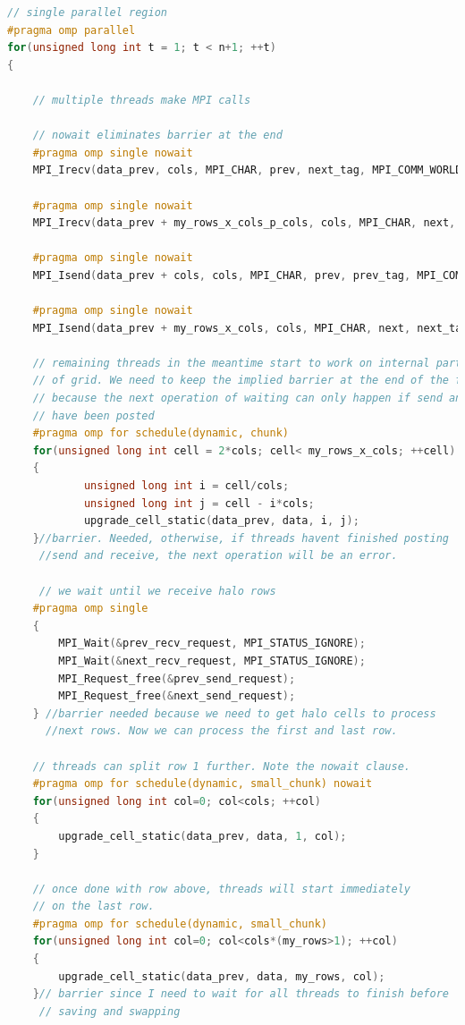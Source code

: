 \documentclass{report}
\begin{document}
\begin{lstlisting}[language=C++]
// single parallel region
#pragma omp parallel
for(unsigned long int t = 1; t < n+1; ++t)
{

    // multiple threads make MPI calls

    // nowait eliminates barrier at the end
    #pragma omp single nowait
    MPI_Irecv(data_prev, cols, MPI_CHAR, prev, next_tag, MPI_COMM_WORLD, &prev_recv_request);

    #pragma omp single nowait
    MPI_Irecv(data_prev + my_rows_x_cols_p_cols, cols, MPI_CHAR, next, prev_tag, MPI_COMM_WORLD, &next_recv_request);

    #pragma omp single nowait
    MPI_Isend(data_prev + cols, cols, MPI_CHAR, prev, prev_tag, MPI_COMM_WORLD, &prev_send_request);

    #pragma omp single nowait
    MPI_Isend(data_prev + my_rows_x_cols, cols, MPI_CHAR, next, next_tag, MPI_COMM_WORLD, &next_send_request);

    // remaining threads in the meantime start to work on internal part 
    // of grid. We need to keep the implied barrier at the end of the for loop 
    // because the next operation of waiting can only happen if send and recv 
    // have been posted
    #pragma omp for schedule(dynamic, chunk)
    for(unsigned long int cell = 2*cols; cell< my_rows_x_cols; ++cell)
    {
            unsigned long int i = cell/cols;
            unsigned long int j = cell - i*cols;
            upgrade_cell_static(data_prev, data, i, j);
    }//barrier. Needed, otherwise, if threads havent finished posting 
     //send and receive, the next operation will be an error.

     // we wait until we receive halo rows
    #pragma omp single
    {
        MPI_Wait(&prev_recv_request, MPI_STATUS_IGNORE);
        MPI_Wait(&next_recv_request, MPI_STATUS_IGNORE);
        MPI_Request_free(&prev_send_request);
        MPI_Request_free(&next_send_request);
    } //barrier needed because we need to get halo cells to process 
      //next rows. Now we can process the first and last row.

    // threads can split row 1 further. Note the nowait clause.
    #pragma omp for schedule(dynamic, small_chunk) nowait
    for(unsigned long int col=0; col<cols; ++col)
    {
        upgrade_cell_static(data_prev, data, 1, col);
    }

    // once done with row above, threads will start immediately 
    // on the last row.
    #pragma omp for schedule(dynamic, small_chunk)
    for(unsigned long int col=0; col<cols*(my_rows>1); ++col)
    {
        upgrade_cell_static(data_prev, data, my_rows, col);
    }// barrier since I need to wait for all threads to finish before 
     // saving and swapping


\end{lstlisting}
\end{document}
